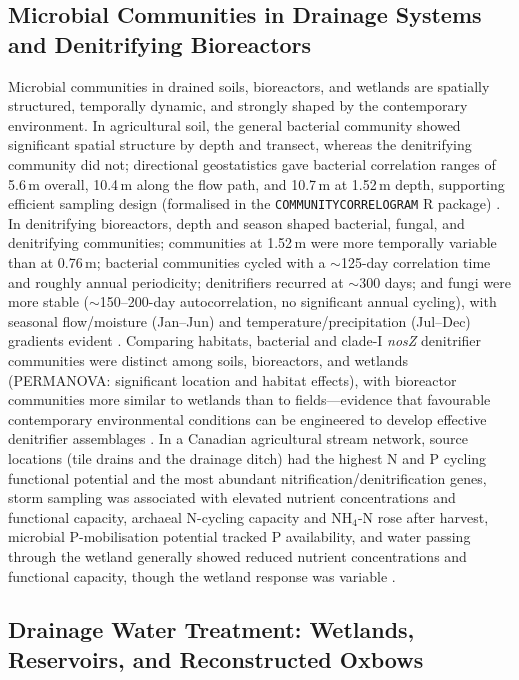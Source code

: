 \subsection{Microbial Communities in Drainage Systems and Denitrifying Bioreactors}

Microbial communities in drained soils, bioreactors, and wetlands are spatially structured, temporally dynamic, and strongly shaped by the contemporary environment. In agricultural soil, the general bacterial community showed significant spatial structure by depth and transect, whereas the denitrifying community did not; directional geostatistics gave bacterial correlation ranges of 5.6\,m overall, 10.4\,m along the flow path, and 10.7\,m at 1.52\,m depth, supporting efficient sampling design (formalised in the \texttt{COMMUNITYCORRELOGRAM} R package) \parencite{Andrus2014}. In denitrifying bioreactors, depth and season shaped bacterial, fungal, and denitrifying communities; communities at 1.52\,m were more temporally variable than at 0.76\,m; bacterial communities cycled with a $\sim$125-day correlation time and roughly annual periodicity; denitrifiers recurred at $\sim$300 days; and fungi were more stable ($\sim$150--200-day autocorrelation, no significant annual cycling), with seasonal flow/moisture (Jan--Jun) and temperature/precipitation (Jul--Dec) gradients evident \parencite{Porter2015}. Comparing habitats, bacterial and clade-I \textit{nosZ} denitrifier communities were distinct among soils, bioreactors, and wetlands (PERMANOVA: significant location and habitat effects), with bioreactor communities more similar to wetlands than to fields---evidence that favourable contemporary environmental conditions can be engineered to develop effective denitrifier assemblages \parencite{Hathaway2015}. In a Canadian agricultural stream network, source locations (tile drains and the drainage ditch) had the highest N and P cycling functional potential and the most abundant nitrification/denitrification genes, storm sampling was associated with elevated nutrient concentrations and functional capacity, archaeal N-cycling capacity and NH$_4$-N rose after harvest, microbial P-mobilisation potential tracked P availability, and water passing through the wetland generally showed reduced nutrient concentrations and functional capacity, though the wetland response was variable \parencite{Knorr2023}.

\subsection{Drainage Water Treatment: Wetlands, Reservoirs, and Reconstructed Oxbows}

